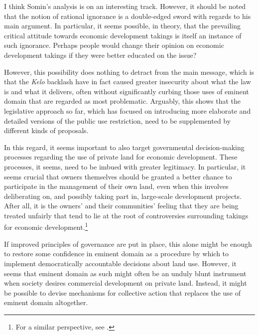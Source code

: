 I think Somin's analysis is on an interesting track. However, it should be noted that the notion of rational ignorance is a double-edged sword with regards to his main argument. In particular, it seems possible, in theory, that the prevailing critical attitude towards economic development takings is itself an instance of such ignorance. Perhaps people would change their opinion on economic development takings if they were better educated on the issue?

However, this possibility does nothing to detract from the main message, which is that the {\it Kelo} backlash have in fact caused greater insecurity about what the law is and what it delivers, often without significantly curbing those uses of eminent domain that are regarded as most problematic. Arguably, this shows that the legislative approach so far, which has focused on introducing more elaborate and detailed versions of the public use restriction, need to be supplemented by different kinds of proposals. 

In this regard, it seems important to also target governmental decision-making processes regarding the use of private land for economic development. These processes, it seems, need to be imbued with greater legitimacy. In particular, it seems crucial that owners themselves should be granted a better chance to participate in the management of their own land, even when this involves deliberating on, and possibly taking part in, large-scale development projects. After all, it is the owners' and their communities' feeling that they are being treated unfairly that tend to lie at the root of controversies surrounding takings for economic development.\footnote{For a similar perspective, see \cite{underkuffler06}.}

If improved principles of governance are put in place, this alone might be enough to restore some confidence in eminent domain as a procedure by which to implement democratically accountable decisions about land use. However, it seems that eminent domain as such might often be an unduly blunt instrument when society desires commercial development on private land. Instead, it might be possible to devise mechanisms for collective action that replaces the use of eminent domain altogether. %

